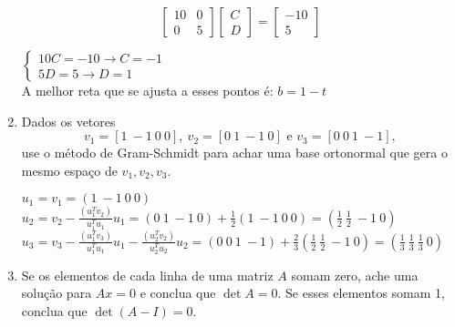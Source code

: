 \documentclass[leqno]{article}
\numberwithin{equation}{section}
\begin{document}
\begin{enumerate}
\begin{sol}
		$$\begin{bmatrix}
			10 & 0 \\
			0 & 5
		\end{bmatrix}\begin{bmatrix}
		C \\
		D
		\end{bmatrix} = \begin{bmatrix}
		-10 \\
		5
		\end{bmatrix}$$
		
		
		$
		\left\{
		\begin {array}{cl}
		10C = -10 \rightarrow C = -1\\
		5D = 5 \rightarrow D = 1
		\end{array}
		\right.
		$\\
		
		A melhor reta que se ajusta a esses pontos é: $b = 1 - t$
		\end{sol}
		
		
		\item Dados os vetores
		$$v_1 = [1 \ -1 \ 0 \ 0], \ v_2 = [0 \ 1 \ -1 \ 0] \mbox{ e } v_3 = [0 \ 0 \ 1 \ -1],$$
		use o método de Gram-Schmidt para achar uma base ortonormal que gera o mesmo espaço de $v_1, v_2, v_3$.
		
		\begin{sol}
			
			$u_1 = v_1 = (1 \ -1 \ 0 \ 0)$\\
			$u_2 = v_2 - \frac{(u_1^Tv_2)}{u_1^Tu_1}u_1 = (0 \ 1 \ -1 \ 0) + \frac{1}{2}(1 \ -1 \ 0 \ 0) = (\frac{1}{2} \ \frac{1}{2} \ -1 \ 0)$\\
			$u_3 = v_3 - \frac{(u_1^Tv_3)}{u_1^Tu_1}u_1 - \frac{(u_2^Tv_2)}{u_2^Tu_2}u_2 = (0 \ 0 \ 1 \ -1) + \frac{2}{3}(\frac{1}{2} \ \frac{1}{2} \ -1 \ 0) = (\frac{1}{3} \ \frac{1}{3} \ \frac{1}{3} \ 0)$
			
		\end{sol}
		
		
		\item Se os elementos de cada linha de uma matriz $A$ somam zero, ache uma solução para $Ax = 0$ e conclua que $\det A = 0$. Se esses elementos somam 1, conclua que $\det(A - I) = 0$.
		

\end{enumerate}
\end{document}
